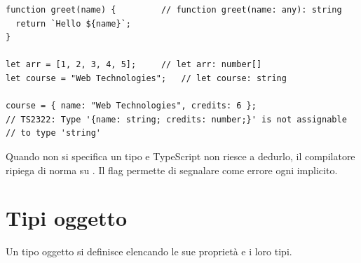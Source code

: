 \begin{affianco}[0.62][c]
\codicepiccolo
\begin{lstlisting}[style=ts]
function greet(name) {         // function greet(name: any): string
  return `Hello ${name}`;
}

let arr = [1, 2, 3, 4, 5];     // let arr: number[]
let course = "Web Technologies";   // let course: string

course = { name: "Web Technologies", credits: 6 };
// TS2322: Type '{name: string; credits: number;}' is not assignable
// to type 'string'
\end{lstlisting}
\risultato
\begin{immagine}
\end{immagine}
\end{affianco}

Quando non si specifica un tipo e TypeScript non riesce a dedurlo, il
compilatore ripiega di norma su . Il flag 
permette di segnalare come errore ogni  implicito.


\section{Tipi oggetto}

Un tipo oggetto si definisce elencando le sue proprietà e i loro tipi.

